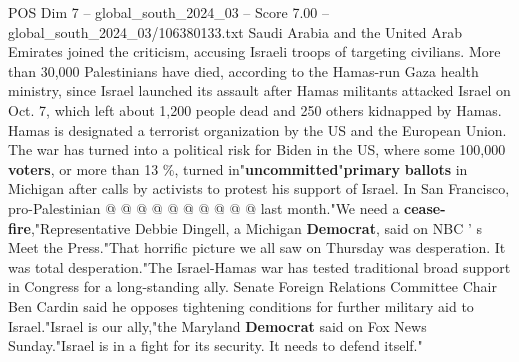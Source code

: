 \begin{textsample}{POS Dim 7 – global\_south\_2024\_03 – Score 7.00 – global\_south\_2024\_03/106380133.txt}
Saudi Arabia and the United Arab Emirates joined the criticism, accusing Israeli troops of targeting civilians.
More than 30,000 Palestinians have died, according to the Hamas-run Gaza health ministry, since Israel launched its assault after Hamas militants attacked Israel on Oct. 7, which left about 1,200 people dead and 250 others kidnapped by Hamas.
Hamas is designated a terrorist organization by the US and the European Union.
The war has turned into a political risk for Biden in the US, where some 100,000 \textbf{voters}, or more than 13 \%, turned in"\textbf{uncommitted}"\textbf{primary} \textbf{ballots} in Michigan after calls by activists to protest his support of Israel.
In San Francisco, pro-Palestinian @ @ @ @ @ @ @ @ @ @ last month."We need a \textbf{cease-fire},"Representative Debbie Dingell, a Michigan \textbf{Democrat}, said on NBC ' s Meet the Press."That horrific picture we all saw on Thursday was desperation.
It was total desperation."The Israel-Hamas war has tested traditional broad support in Congress for a long-standing ally.
Senate Foreign Relations Committee Chair Ben Cardin said he opposes tightening conditions for further military aid to Israel."Israel is our ally,"the Maryland \textbf{Democrat} said on Fox News Sunday."Israel is in a fight for its security.
It needs to defend itself."

\end{textsample}
